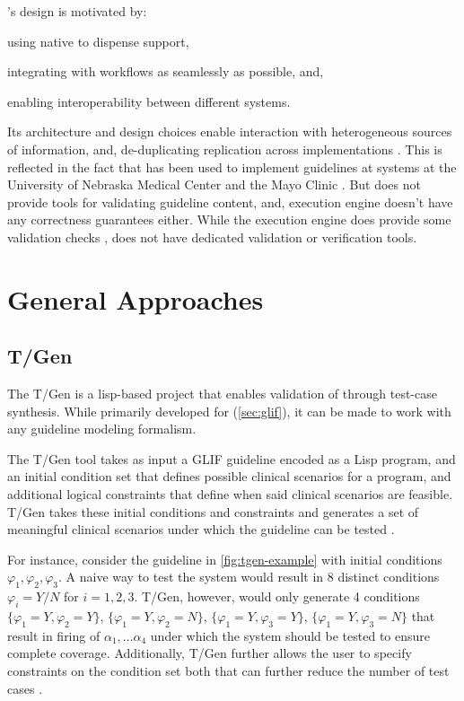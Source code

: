 \SAGE{}'s design is motivated by:
\begin{enumerate*}[label=(\roman*)]
  \item using native \EHR{} to dispense support,
  \item integrating with workflows as seamlessly as possible, and,
  \item enabling interoperability between different \EHR{} systems.
\end{enumerate*}
Its architecture and design choices enable interaction with heterogeneous
sources of information, and, de-duplicating replication across \EHR{}
implementations \cite{TuAMIA07}. This is reflected in the fact that
\SAGE{} has been used to implement guidelines at \EHR{} systems
at the University of Nebraska Medical Center and the Mayo Clinic \cite{TuAMIA07}.
But \SAGE{} does not provide tools for validating guideline content, and,
execution engine doesn't have any correctness guarantees either. While
the execution engine does provide some validation checks \cite{RamMEDINFO04},
\SAGE{} does not have dedicated validation or verification tools.

\section{General Approaches}\label{sec:general-approaches}

\subsection{T/Gen}

The T/Gen is a lisp-based project that enables validation
of \CIGs{} through test-case synthesis. While
primarily developed for \GLIF{} (\autoref{sec:glif}),
it can be made to work with any guideline modeling formalism.

The T/Gen tool takes as input a GLIF guideline encoded as a
Lisp program, and an initial condition set that defines
possible clinical scenarios for a program, and additional
logical constraints that define when said clinical scenarios are
feasible. T/Gen takes these initial conditions and constraints and
generates a set of meaningful clinical scenarios under which the
guideline can be tested \cite{MillerJAMIA01}.

For instance, consider the guideline in \autoref{fig:tgen-example}
with initial conditions $\varphi_1, \varphi_2, \varphi_3$. A naive
way to test the system would result in 8 distinct conditions $\varphi_i = Y/N$
for $i = 1,2,3$. T/Gen, however, would only generate
4 conditions $\{\varphi_1 = Y, \varphi_2 = Y\}$,
$\{\varphi_1 = Y, \varphi_2 = N\}$, $\{\varphi_1 = Y, \varphi_3 = Y\}$,
$\{\varphi_1 = Y, \varphi_3 = N\}$ that result in firing of $\alpha_1, \dots
\alpha_4$ under which the system should be tested to ensure complete coverage.
Additionally, T/Gen further allows the user to specify constraints on
the condition set both that can further reduce
the number of test cases \cite{MillerJAMIA01}.

